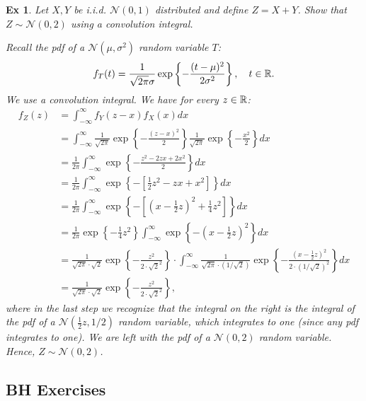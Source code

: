\documentclass[a4paper,11pt]{article}
\newtheorem{exercise}[theorem]{Ex}
\begin{document}
\begin{exercise}
Let $X,Y$ be i.i.d. $\mathcal{N}(0,1)$ distributed and define $Z = X + Y$. Show that $Z \sim \mathcal{N}(0,2)$ using a convolution integral.

\begin{solution}
Recall the pdf of a $\mathcal{N}(\mu,\sigma^2)$ random variable $T$:
\begin{align}
    f_T(t) = \frac{1}{\sqrt{2\pi}\sigma} \exp\left\{-\frac{(t-\mu)^2}{2 \sigma^2}\right\}, \quad t \in \mathbb{R}.
\end{align}
We use a convolution integral. We have for every $z \in \mathbb{R}$:
\begin{align}
    f_Z(z) &= \int_{-\infty}^\infty f_Y(z - x) f_X(x) dx \\
    &= \int_{-\infty}^\infty \frac{1}{\sqrt{2\pi}} \exp\left\{-\frac{(z - x)^2}{2}\right\} \frac{1}{\sqrt{2\pi}} \exp\left\{-\frac{x^2}{2 }\right\} dx \\
    &= \frac{1}{2\pi} \int_{-\infty}^\infty  \exp\left\{-\frac{z^2 - 2zx + 2 x^2}{2}\right\} dx \\
    &= \frac{1}{2\pi} \int_{-\infty}^\infty  \exp\left\{-\left[\frac{1}{2}z^2 - zx +  x^2\right]\right\} dx \\
    &= \frac{1}{2\pi} \int_{-\infty}^\infty  \exp\left\{-\left[\left(x - \frac{1}{2}z\right)^2 + \frac{1}{4}z^2\right]\right\} dx \\
    &= \frac{1}{2\pi} \exp\left\{-\frac{1}{4}z^2\right\} \int_{-\infty}^\infty  \exp\left\{-\left(x - \frac{1}{2}z\right)^2\right\} dx \\
    &= \frac{1}{\sqrt{2\pi} \cdot \sqrt{2}} \exp\left\{-\frac{z^2}{2 \cdot \sqrt{2}^2}\right\} \cdot \int_{-\infty}^\infty  \frac{1}{\sqrt{2\pi} \cdot (1/\sqrt{2})} \exp\left\{-\frac{\left(x - \tfrac{1}{2}z\right)^2}{2 \cdot (1/\sqrt{2})^2}\right\} dx \\
    &= \frac{1}{\sqrt{2\pi} \cdot \sqrt{2}} \exp\left\{-\frac{z^2}{2 \cdot \sqrt{2}^2}\right\},
\end{align}
where in the last step we recognize that the integral on the right is the integral of the pdf of a $\mathcal{N}(\tfrac{1}{2}z, 1/2)$ random variable, which integrates to one (since any pdf integrates to one). We are left with the pdf of a $\mathcal{N}(0,2)$ random variable. Hence, $Z \sim \mathcal{N}(0,2)$.
\end{solution}
\end{exercise}


\subsection{BH Exercises}
\end{document}
